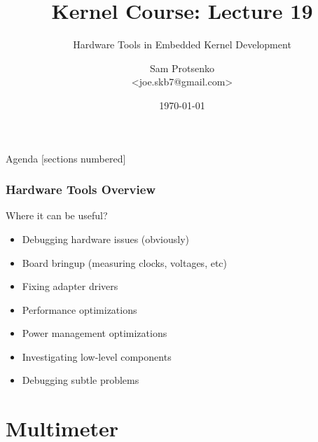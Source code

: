 

\title{Kernel Course: Lecture 19}
\subtitle{Hardware Tools in Embedded Kernel Development}
\author{Sam Protsenko \texorpdfstring{\\ <joe.skb7@gmail.com>}{}}
\date{\vspace*{5mm}\today}




\maketitle

\begin{frame}{Agenda}
  [sections numbered]
  \tableofcontents[hideallsubsections]
\end{frame}


\begin{frame}
  \frametitle{Hardware Tools Overview}
  Where it can be useful?
  \begin{itemize}
    \item Debugging hardware issues (obviously)
    \item Board bringup (measuring clocks, voltages, etc)
    \item Fixing adapter drivers
    \item Performance optimizations
    \item Power management optimizations
    \item Investigating low-level components
    \item Debugging subtle problems
  \end{itemize}
\end{frame}

\section{Multimeter}

